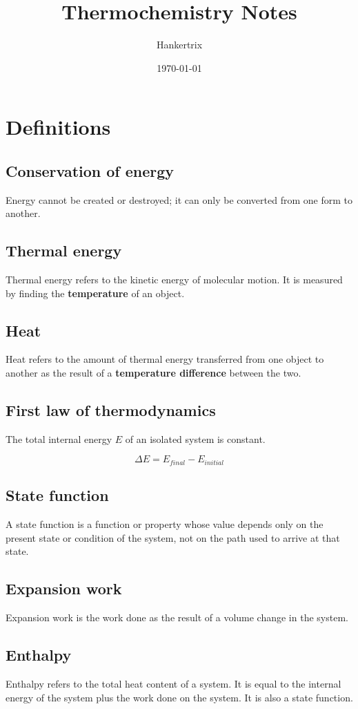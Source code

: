 \documentclass[11pt]{article}
\author{Hankertrix}
\date{\today}
\title{Thermochemistry Notes}
\begin{document}
\maketitle
\setcounter{tocdepth}{2}
\tableofcontents \clearpage\section{Definitions}
\label{sec:org2f662b7}

\subsection{Conservation of energy}
\label{sec:org13781ec}
Energy cannot be created or destroyed; it can only be converted from one form to another.
\subsection{Thermal energy}
\label{sec:orge04b557}
Thermal energy refers to the kinetic energy of molecular motion. It is measured by finding the \textbf{temperature} of an object.
\subsection{Heat}
\label{sec:org0fdb4c6}
Heat refers to the amount of thermal energy transferred from one object to another as the result of a \textbf{temperature difference} between the two.
\subsection{First law of thermodynamics}
\label{sec:org923707a}
The total internal energy \(E\) of an isolated system is constant.

\[\Delta E  = E_{final} - E_{initial}\]
\subsection{State function}
\label{sec:org6cda6b6}
A state function is a function or property whose value depends only on the present state or condition of the system, not on the path used to arrive at that state.
\subsection{Expansion work}
\label{sec:orgbde60a4}
Expansion work is the work done as the result of a volume change in the system.
\subsection{Enthalpy}
\label{sec:org034bc9a}
Enthalpy refers to the total heat content of a system. It is equal to the internal energy of the system plus the work done on the system. It is also a state function.
\end{document}
